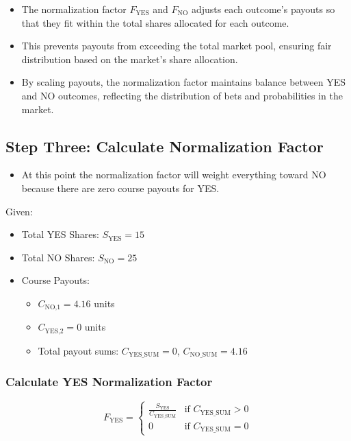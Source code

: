 \documentclass{article}
\begin{document}
\begin{itemize}
    \item The normalization factor \( F_{\text{YES}} \) and \( F_{\text{NO}} \) adjusts each outcome's payouts so that they fit within the total shares allocated for each outcome.
    \item This prevents payouts from exceeding the total market pool, ensuring fair distribution based on the market's share allocation.
    \item By scaling payouts, the normalization factor maintains balance between YES and NO outcomes, reflecting the distribution of bets and probabilities in the market.
\end{itemize}

\newpage

\subsection*{Step Three: Calculate Normalization Factor}

\begin{itemize}
    \item At this point the normalization factor will weight everything toward NO because there are zero course payouts for YES.
\end{itemize}

Given:
\begin{itemize}
    \item Total YES Shares: \( S_{\text{YES}} = 15 \)
    \item Total NO Shares: \( S_{\text{NO}} = 25 \)
    \item Course Payouts:
    \begin{itemize}
        \item \( C_{\text{NO,1}} = 4.16 \) units
        \item \( C_{\text{YES,2}} = 0 \) units
        \item Total payout sums: \( C_{\text{YES\_SUM}} = 0 \), \( C_{\text{NO\_SUM}} = 4.16 \)
    \end{itemize}
\end{itemize}

\subsubsection*{Calculate YES Normalization Factor}

\[
F_{\text{YES}} =
\begin{cases}
      \frac{S_{\text{YES}}}{C_{\text{YES\_SUM}}} & \text{if } C_{\text{YES\_SUM}} > 0 \\
      0 & \text{if } C_{\text{YES\_SUM}} = 0
   \end{cases}
\]
\end{document}
